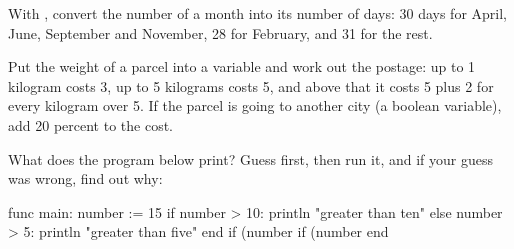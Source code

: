 \exercise With , convert the number of a month into its number
of days: 30 days for April, June, September and November, 28 for February,
and 31 for the rest.

\exercise Put the weight of a parcel into a variable and work out the
postage: up to 1 kilogram costs 3, up to 5 kilograms costs 5, and above that
it costs 5 plus 2 for every kilogram over 5. If the parcel is going to
another city (a boolean variable), add 20 percent to the cost.

\exercise What does the program below print? Guess first, then run it, and
if your guess was wrong, find out why:
\begin{salamcode}
func main:
    number := 15
    if number > 10:
        println "greater than ten"
    else number > 5:
        println "greater than five"
    end
    if (number %
    if (number %
end
\end{salamcode}
